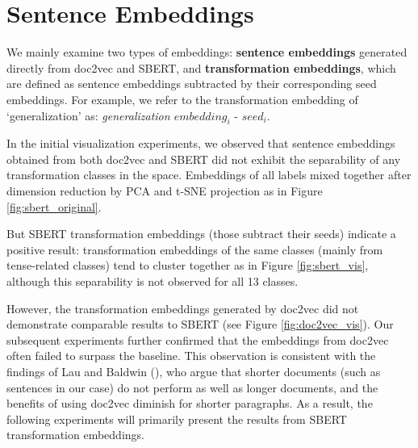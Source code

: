\documentclass[11pt]{article}
\begin{document}
\section{Sentence Embeddings} \label{sec: embeddings}

We mainly examine two types of embeddings: \textbf{sentence embeddings} generated directly from doc2vec and SBERT, and \textbf{transformation embeddings}, which are defined as sentence embeddings subtracted by their corresponding seed embeddings.  For example, we refer to the transformation embedding of `generalization' as:  \textit{generalization $embedding_i$}  -   \textit{$seed_i$}.


In the initial visualization experiments, we observed that sentence embeddings obtained from both doc2vec and SBERT did not exhibit the separability of any transformation classes in the space. Embeddings of all labels mixed together after dimension reduction by PCA and t-SNE projection as in Figure \ref{fig:sbert_original}. 

But SBERT transformation embeddings (those subtract their seeds) indicate a positive result: transformation embeddings of the same classes (mainly from tense-related classes)  tend to cluster together as in Figure \ref{fig:sbert_vis}, although this separability is not observed for all 13 classes.   

However, the transformation embeddings generated by doc2vec did not demonstrate comparable results to SBERT (see Figure \ref{fig:doc2vec_vis}). Our subsequent experiments further confirmed that the embeddings from doc2vec often failed to surpass the baseline. This observation is consistent with the findings of Lau and Baldwin (\citeyear{lau-baldwin-2016-empirical}), who argue that shorter documents (such as sentences in our case) do not perform as well as longer documents, and the benefits of using doc2vec diminish for shorter paragraphs. As a result, the following experiments will primarily present the results from SBERT transformation embeddings.
\end{document}
